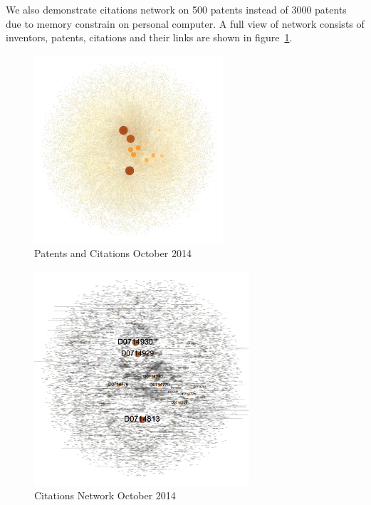 \documentclass{article}
\begin{document}
We also demonstrate citations network on 500 patents instead of 3000 patents due to memory constrain on personal computer. A full view of network consists of inventors, patents, citations and their links are shown in figure~\ref{fig:citation}. 
\begin{figure}[H]
\centering
\includegraphics[width=70mm]{citation.png}
\caption{ Patents and Citations October 2014 }\label{fig:citation}
\end{figure}

\begin{figure}[H]
\centering
\includegraphics[width=80mm]{citation-label.png}
\caption{ Citations Network October 2014 }\label{fig:citationlabel}
\end{figure}
\end{document}
